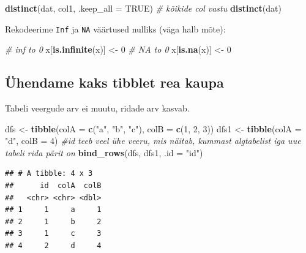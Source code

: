 \documentclass[]{book}
\newenvironment{Shaded}{\begin{snugshade}}{\end{snugshade}}
\newcommand{\KeywordTok}[1]{\textcolor[rgb]{0.13,0.29,0.53}{\textbf{#1}}}
\newcommand{\DataTypeTok}[1]{\textcolor[rgb]{0.13,0.29,0.53}{#1}}
\newcommand{\DecValTok}[1]{\textcolor[rgb]{0.00,0.00,0.81}{#1}}
\newcommand{\StringTok}[1]{\textcolor[rgb]{0.31,0.60,0.02}{#1}}
\newcommand{\CommentTok}[1]{\textcolor[rgb]{0.56,0.35,0.01}{\textit{#1}}}
\newcommand{\OtherTok}[1]{\textcolor[rgb]{0.56,0.35,0.01}{#1}}
\newcommand{\NormalTok}[1]{#1}
\begin{document}
\begin{Shaded}
\begin{Highlighting}[]
\KeywordTok{distinct}\NormalTok{(dat, col1, }\DataTypeTok{.keep_all =} \OtherTok{TRUE}\NormalTok{)}
\CommentTok{# kõikide col vastu}
\KeywordTok{distinct}\NormalTok{(dat) }
\end{Highlighting}
\end{Shaded}

Rekodeerime \texttt{Inf} ja \texttt{NA} väärtused nulliks (väga halb
mõte):

\begin{Shaded}
\begin{Highlighting}[]
\CommentTok{# inf to 0}
\NormalTok{x[}\KeywordTok{is.infinite}\NormalTok{(x)] <-}\StringTok{ }\DecValTok{0}
\CommentTok{# NA to 0}
\NormalTok{x[}\KeywordTok{is.na}\NormalTok{(x)] <-}\StringTok{ }\DecValTok{0}
\end{Highlighting}
\end{Shaded}

\subsection{Ühendame kaks tibblet rea
kaupa}\label{uhendame-kaks-tibblet-rea-kaupa}

Tabeli veergude arv ei muutu, ridade arv kasvab.

\begin{Shaded}
\begin{Highlighting}[]
\NormalTok{dfs <-}\StringTok{ }\KeywordTok{tibble}\NormalTok{(}\DataTypeTok{colA =} \KeywordTok{c}\NormalTok{(}\StringTok{"a"}\NormalTok{, }\StringTok{"b"}\NormalTok{, }\StringTok{"c"}\NormalTok{), }\DataTypeTok{colB =} \KeywordTok{c}\NormalTok{(}\DecValTok{1}\NormalTok{, }\DecValTok{2}\NormalTok{, }\DecValTok{3}\NormalTok{))}
\NormalTok{dfs1 <-}\StringTok{ }\KeywordTok{tibble}\NormalTok{(}\DataTypeTok{colA =} \StringTok{"d"}\NormalTok{, }\DataTypeTok{colB =}  \DecValTok{4}\NormalTok{)}
\CommentTok{#id teeb veel ühe veeru, mis näitab, kummast algtabelist iga uue tabeli rida pärit on }
\KeywordTok{bind_rows}\NormalTok{(dfs, dfs1, }\DataTypeTok{.id =} \StringTok{"id"}\NormalTok{)}
\end{Highlighting}
\end{Shaded}

\begin{verbatim}
## # A tibble: 4 x 3
##      id  colA  colB
##   <chr> <chr> <dbl>
## 1     1     a     1
## 2     1     b     2
## 3     1     c     3
## 4     2     d     4
\end{verbatim}
\end{document}
